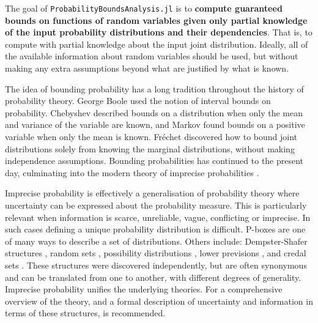 \documentclass{juliacon}
\begin{document}
The goal of \texttt{ProbabilityBoundsAnalysis.jl} is to \textbf{compute guaranteed bounds on functions of random variables given only partial knowledge of the input probability distributions and their dependencies}. That is, to compute with partial knowledge about the input joint distribution. Ideally, all of the available information about random variables should be used, but without making any extra assumptions beyond what are justified by what is known.

The idea of bounding probability has a long tradition throughout the history of probability theory. George Boole \cite{boole1854investigation, hailperin1986boole} used the notion of interval bounds on probability. Chebyshev \cite{chebyshev1874valeurs} described bounds on a distribution when only the mean and variance of the variable are known, and Markov \cite{markoff1900question} found bounds on a positive variable when only the mean is known.  Fréchet \cite{frechet1935generalisation} discovered how to bound joint distributions solely from knowing the marginal distributions, without making independence assumptions. Bounding probabilities has continued to the present day, culminating into the modern theory of imprecise probabilities \cite{walley1991statistical, klir2013uncertainty, troffaes2014lower, augustin2014introduction}.

Imprecise probability is effectively a generalisation of probability theory where uncertainty can be expressed about the probability measure. This is particularly relevant when information is scarce, unreliable, vague, conflicting or imprecise. In such cases defining a unique probability distribution is difficult. P-boxes are one of many ways to describe a set of distributions. Others include: Dempster-Shafer structures \cite{dempster2008upper,shafer1976mathematical}, random sets \cite{molchanov2005theory}, possibility distributions \cite{zadeh1978fuzzy,dubois1988possibility, hose2019possibilistic}, lower previsions \cite{troffaes2014lower}, and credal sets \cite{levi1983enterprise}. These structures were discovered independently, but are often synonymous and can be translated from one to another, with different degrees of generality. Imprecise probability unifies the underlying theories. For a comprehensive overview of the theory, and a formal description of uncertainty and information in terms of these structures, \cite{klir2013uncertainty} is recommended.
\end{document}
